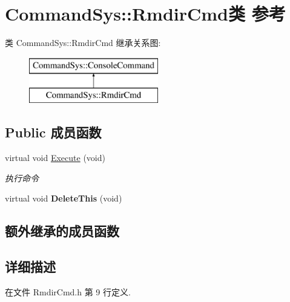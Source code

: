 \hypertarget{class_command_sys_1_1_rmdir_cmd}{\section{Command\-Sys\-:\-:Rmdir\-Cmd类 参考}
\label{class_command_sys_1_1_rmdir_cmd}
}
类 Command\-Sys\-:\-:Rmdir\-Cmd 继承关系图\-:\begin{figure}[H]
\begin{center}
\leavevmode
\includegraphics[height=2.000000cm]{class_command_sys_1_1_rmdir_cmd}
\end{center}
\end{figure}
\subsection*{Public 成员函数}
\begin{DoxyCompactItemize}
\item 
virtual void \hyperlink{class_command_sys_1_1_rmdir_cmd_a66d3b433eecba42b9f00f7fc3f09f623}{Execute} (void)
\begin{DoxyCompactList}\small\item\em 执行命令 \end{DoxyCompactList}\item 
\hypertarget{class_command_sys_1_1_rmdir_cmd_a112e65f47f834b1ee9b1cadd758378d6}{virtual void {\bfseries Delete\-This} (void)}\label{class_command_sys_1_1_rmdir_cmd_a112e65f47f834b1ee9b1cadd758378d6}

\end{DoxyCompactItemize}
\subsection*{额外继承的成员函数}


\subsection{详细描述}


在文件 Rmdir\-Cmd.\-h 第 9 行定义.




